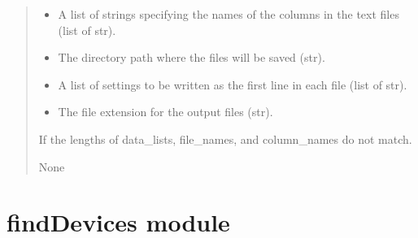 \documentclass[letterpaper,10pt,english]{sphinxmanual}
\begin{document}
\begin{fulllineitems}
\begin{fulllineitems}
\begin{quote}
\begin{description}
\begin{itemize}
\item {} 
\sphinxAtStartPar
{} \textendash{} A list of strings specifying the names of the columns in the text files (list of str).

\item {} 
\sphinxAtStartPar
{} \textendash{} The directory path where the files will be saved (str).

\item {} 
\sphinxAtStartPar
{} \textendash{} A list of settings to be written as the first line in each file (list of str).

\item {} 
\sphinxAtStartPar
{} \textendash{} The file extension for the output files (str).

\end{itemize}

\sphinxAtStartPar
{} \textendash{} If the lengths of data\_lists, file\_names, and column\_names do not match.

\sphinxAtStartPar
None

\end{description}\end{quote}

\end{fulllineitems}


\end{fulllineitems}


\sphinxstepscope


\chapter{findDevices module}
\label{\detokenize{findDevices:module-findDevices}}\label{\detokenize{findDevices:finddevices-module}}\label{\detokenize{findDevices::doc}}
\end{document}
